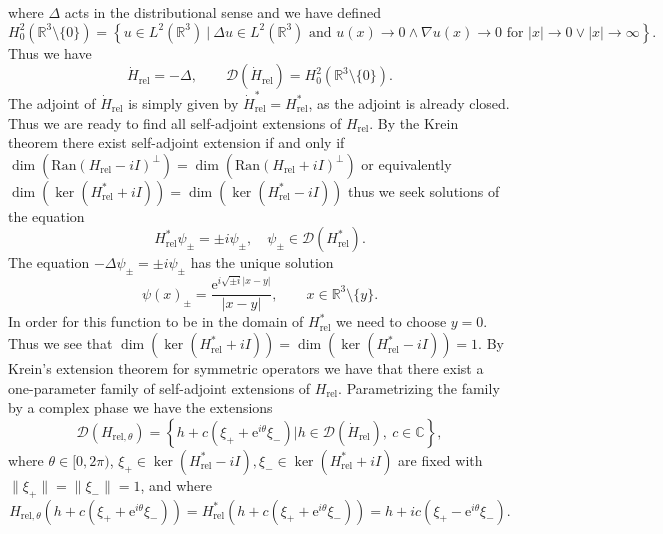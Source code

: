 \documentclass[a4paper,11pt]{article}
\newcommand{\euler}[1]{\text{e}^{#1}}
\newcommand{\dom}[1]{\mathscr D\left(#1\right)}
\newcommand{\Ran}[1]{\text{Ran}\left(#1\right)}
\newcommand{\R}{\mathbb{R}}
\newcommand{\C}{\mathbb{C}}
\numberwithin{equation}{section}
\begin{document}
where $ \Delta $ acts in the distributional sense and we have defined\begin{equation}
H^2_0(\R^3\setminus\{0\})=\left\{u\in L^2(\R^3)\ \big\rvert\ \Delta u\in L^2(\R^3)\text{ and } u(x)\to0\wedge\nabla u(x)\to0 \text{ for } |x|\to0\vee |x|\to\infty\right\}.
\end{equation} Thus we have \begin{equation}
\dot{H}_{\text{rel}}=-\Delta,\qquad \dom{\dot{H}_{\text{rel}}}=H^2_0(\R^3\setminus\{0\}).
\end{equation}
The adjoint of $ \dot{H}_{\text{rel}} $ is simply given by $ \dot{H}_{\text{rel}}^*=H_{\text{rel}}^* $, as the adjoint is already closed. Thus we are ready to find all self-adjoint extensions of $ H_{\text{rel}} $. By the Krein theorem there exist self-adjoint extension if and only if $ \dim\left(\Ran{H_{\text{rel}}-iI}^\perp\right)=\dim\left(\Ran{H_{\text{rel}}+iI}^\perp\right) $ or equivalently $ \dim\left(\ker{\left(H^*_{\text{rel}}+iI\right)}\right)=\dim\left(\ker{\left(H^*_{\text{rel}}-iI\right)}\right) $ thus we seek solutions of the equation \begin{equation}
H_{\text{rel}}^*\psi_\pm=\pm i \psi_\pm,\quad \psi_\pm\in\dom{H_{\text{rel}}^*}.
\end{equation}
The equation $ -\Delta \psi_\pm=\pm i \psi_\pm $ has the unique solution \begin{equation}
\psi(x)_\pm=\frac{\euler{ i\sqrt{\pm i}|x-y|}}{|x-y|},\qquad x\in\R^3\setminus\{y\}.
\end{equation}
In order for this function to be in the domain of $ H_{\text{rel}}^*$ we need to choose $ y=0 $.
Thus we see that $ \dim\left(\ker{\left(H^*_{\text{rel}}+iI\right)}\right)=\dim\left(\ker{\left(H^*_{\text{rel}}-iI\right)}\right)=1 $. By Krein's extension theorem for symmetric operators we have that there exist a one-parameter family of self-adjoint extensions of $ H_{\text{rel}} $. Parametrizing the family by a complex phase we have the extensions \begin{equation}
\dom{H_{\text{rel},\theta}}=\left\{ h+c(\xi_++\euler{i\theta}\xi_-)\Big\rvert h\in\dom{\dot{H}_{\text{rel}}},\ c\in\C \right\},
\end{equation}
where $ \theta\in[0,2\pi) $, $ \xi_+\in \ker\left(H_{\text{rel}}^*-iI\right),\xi_-\in \ker\left(H_{\text{rel}}^*+iI\right) $ are fixed with $ \|\xi_+\|=\|\xi_-\|=1 $, and where \begin{equation}
H_{\text{rel},\theta}(h+c(\xi_++\euler{i\theta}\xi_-))=H_{\text{rel}}^*(h+c(\xi_++\euler{i\theta}\xi_-))=h+ic(\xi_+-\euler{i\theta}\xi_-).
\end{equation}
\end{document}
